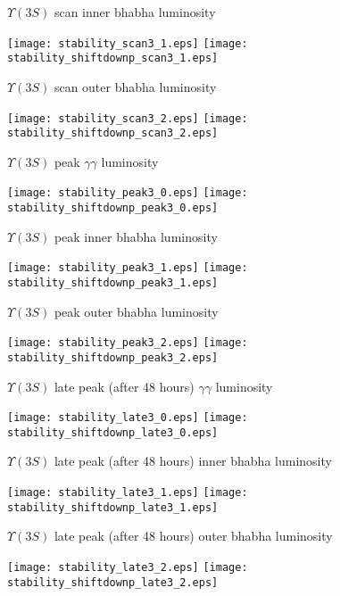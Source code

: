 \documentclass[12pt]{article}
\begin{document}
\vfill $\Upsilon(3S)$ scan inner bhabha luminosity

\begin{center}
\texttt{[image: stability\_scan3\_1.eps]} \texttt{[image: stability\_shiftdownp\_scan3\_1.eps]}
\end{center}


\vfill $\Upsilon(3S)$ scan outer bhabha luminosity

\begin{center}
\texttt{[image: stability\_scan3\_2.eps]} \texttt{[image: stability\_shiftdownp\_scan3\_2.eps]}
\end{center}

\pagebreak

$\Upsilon(3S)$ peak $\gamma\gamma$ luminosity

\begin{center}
\texttt{[image: stability\_peak3\_0.eps]} \texttt{[image: stability\_shiftdownp\_peak3\_0.eps]}
\end{center}


\vfill $\Upsilon(3S)$ peak inner bhabha luminosity

\begin{center}
\texttt{[image: stability\_peak3\_1.eps]} \texttt{[image: stability\_shiftdownp\_peak3\_1.eps]}
\end{center}


\vfill $\Upsilon(3S)$ peak outer bhabha luminosity

\begin{center}
\texttt{[image: stability\_peak3\_2.eps]} \texttt{[image: stability\_shiftdownp\_peak3\_2.eps]}
\end{center}

\pagebreak

$\Upsilon(3S)$ late peak (after 48 hours) $\gamma\gamma$ luminosity

\begin{center}
\texttt{[image: stability\_late3\_0.eps]} \texttt{[image: stability\_shiftdownp\_late3\_0.eps]}
\end{center}


\vfill $\Upsilon(3S)$ late peak (after 48 hours) inner bhabha luminosity

\begin{center}
\texttt{[image: stability\_late3\_1.eps]} \texttt{[image: stability\_shiftdownp\_late3\_1.eps]}
\end{center}


\vfill $\Upsilon(3S)$ late peak (after 48 hours) outer bhabha luminosity

\begin{center}
\texttt{[image: stability\_late3\_2.eps]} \texttt{[image: stability\_shiftdownp\_late3\_2.eps]}
\end{center}
\end{document}

